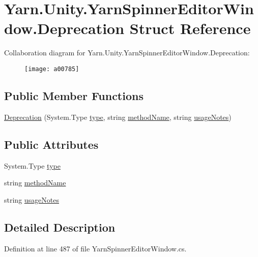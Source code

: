 \hypertarget{a00084}{\section{Yarn.\-Unity.\-Yarn\-Spinner\-Editor\-Window.\-Deprecation Struct Reference}
\label{a00084}
}


Collaboration diagram for Yarn.\-Unity.\-Yarn\-Spinner\-Editor\-Window.\-Deprecation\-:
\nopagebreak
\begin{figure}[H]
\begin{center}
\leavevmode
\texttt{[image: a00785]}
\end{center}
\end{figure}
\subsection*{Public Member Functions}
\begin{DoxyCompactItemize}
\item 
\hyperlink{a00084_ae80171841e97a48611c51a9a574a2fc0}{Deprecation} (System.\-Type \hyperlink{a00084_a750904df254223bf3131c39017f90a0b}{type}, string \hyperlink{a00084_a61605b2d0a17dfdf9c62952270d44fbd}{method\-Name}, string \hyperlink{a00084_ac23509be7ae6b43a3e2154dd430954a7}{usage\-Notes})
\end{DoxyCompactItemize}
\subsection*{Public Attributes}
\begin{DoxyCompactItemize}
\item 
System.\-Type \hyperlink{a00084_a750904df254223bf3131c39017f90a0b}{type}
\item 
string \hyperlink{a00084_a61605b2d0a17dfdf9c62952270d44fbd}{method\-Name}
\item 
string \hyperlink{a00084_ac23509be7ae6b43a3e2154dd430954a7}{usage\-Notes}
\end{DoxyCompactItemize}


\subsection{Detailed Description}


Definition at line 487 of file Yarn\-Spinner\-Editor\-Window.\-cs.



